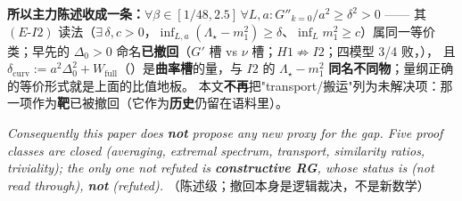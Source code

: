 \textbf{所以主力陈述收成一条：}$\forall\beta\in[1/48,2.5]\,\forall L,a:G''_{k=0}/a^2\ge\delta^2>0$ —— 其 $(E\text{-}I2)$ 读法（$\exists\,\delta,c>0$，$\inf_{L,a}(\Lambda_\star-m_1^2)\ge\delta$、$\inf_L m_1^2\ge c$）属同一等价类；早先的 $\Delta_0>0$ 命名\textbf{已撤回}（$G'$ 槽 vs $\nu$ 槽；$H1\not\Rightarrow I2$；四模型 3/4 败，），
且 $\delta_{\mathrm{curv}}:=a^2\Delta_0^2+W_{\mathrm{full}}$（）是\textbf{曲率槽}的量，与 $I2$ 的 $\Lambda_\star-m_1^2$ \textbf{同名不同物}；量纲正确的等价形式就是上面的比值地板。
本文\textbf{不再}把"transport/搬运"列为未解决项：那一项作为\textbf{靶}已被撤回（它作为\textbf{历史}仍留在语料里）。
\par\smallskip
\emph{Consequently this paper does \textbf{not} propose any new proxy for the gap. Five proof classes are closed (averaging, extremal spectrum, transport, similarity ratios, triviality); the only one not refuted is \textbf{constructive RG}, whose status is \code{[O]} (not read through), \textbf{not} \code{[NG]} (refuted).}
\LT{}（陈述级；撤回本身是逻辑裁决，不是新数学）


